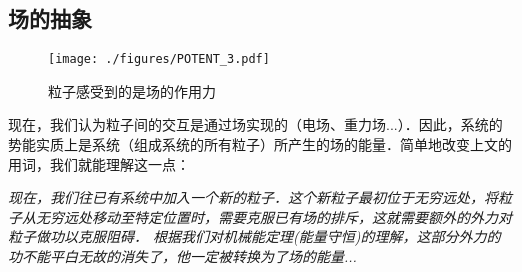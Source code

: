 \subsection{场的抽象}
\begin{figure}[ht]
\centering
\texttt{[image: ./figures/POTENT\_3.pdf]}
\caption{粒子感受到的是场的作用力} \label{POTENT_fig3}
\end{figure}
现在，我们认为粒子间的交互是通过场实现的（电场、重力场...）．因此，系统的势能实质上是系统（组成系统的所有粒子）所产生的场的能量．简单地改变上文的用词，我们就能理解这一点：

\textsl{现在，我们往已有系统中加入一个新的粒子．这个新粒子最初位于无穷远处，将粒子从无穷远处移动至特定位置时，需要克服已有场的排斥，这就需要额外的外力对粒子做功以克服阻碍． 根据我们对机械能定理(能量守恒)的理解，这部分外力的功不能平白无故的消失了，他一定被转换为了场的能量...}
